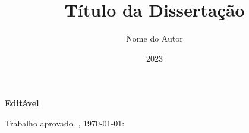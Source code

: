 \documentclass[12pt,a4paper,oneside]{abntex2}
\title{Título da Dissertação}
\author{Nome do Autor}
\date{2023}
\begin{document}

\imprimircapa

\imprimirfolhaderosto*


\begin{fichacatalografica}
    
\end{fichacatalografica}

\begin{folhadeaprovacao}

\end{folhadeaprovacao}

\begin{folhadeaprovacao}

  \begin{center}
    \textbf{Editável}
    
    {\ABNTEXchapterfont\large\imprimirautor}

    \vspace*{\fill}\vspace*{\fill}
    \begin{center}
      \ABNTEXchapterfont\bfseries\Large\imprimirtitulo
    \end{center}
    \vspace*{\fill}
    
    \hspace{.45\textwidth}
    \begin{minipage}{.5\textwidth}
        \imprimirpreambulo
    \end{minipage}%
    \vspace*{\fill}
   \end{center}
        
   Trabalho aprovado. \imprimirlocal, \today:

   
   \begin{center}
    \vspace*{0.5cm}
    {\large\imprimirlocal}
    \par
    {\large\imprimirdata}
    \vspace*{1cm}
  \end{center}
  
\end{folhadeaprovacao}
\end{document}
